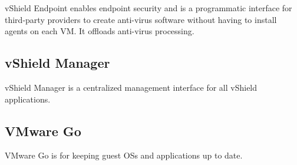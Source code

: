 vShield Endpoint enables endpoint security and is a programmatic interface for
third-party providers to create anti-virus software without having to install
agents on each VM. It offloads anti-virus processing.

\subsection{vShield Manager}

vShield Manager is a centralized management interface for all vShield
applications.

\subsection{VMware Go}

VMware Go is for keeping guest OSs and applications up to date.
